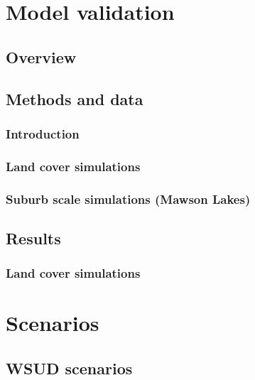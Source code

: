 \documentclass[final,3p,times,authoryear]{elsarticle}
\begin{document}
\section{Model validation}\label{sec:validation}
\subsection{Overview}\label{sec:validationover}



 

\subsection{Methods and data}\label{sec:methods}
\subsubsection{Introduction}\label{sec:methodsintro}



\subsubsection{Land cover simulations}\label{sec:landcoversim} 






\subsubsection{Suburb scale simulations (Mawson Lakes)}\label{sec:suburbsim} 
 

\subsection{Results}\label{sec:Results} 
\subsubsection{Land cover simulations}\label{sec:landcoverresult} 













\section{Scenarios}
\subsection{WSUD scenarios}\label{sec:1}
\end{document}
